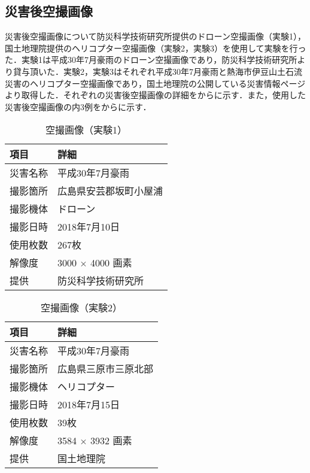     \subsection*{災害後空撮画像}
      災害後空撮画像について防災科学技術研究所提供のドローン空撮画像\cite{防災科研空撮画像}（実験1），国土地理院提供のヘリコプター空撮画像\cite{国土地理院空撮画像1, 国土地理院空撮画像2}（実験2，実験3）を使用して実験を行った．実験1は平成30年7月豪雨のドローン空撮画像であり，防災科学技術研究所より貸与頂いた．実験2，実験3はそれぞれ平成30年7月豪雨と熱海市伊豆山土石流災害のヘリコプター空撮画像であり，国土地理院の公開している災害情報ページより取得した．それぞれの災害後空撮画像の詳細をからに示す．また，使用した災害後空撮画像の内3例をからに示す．

      \begin{table}[t]
        \centering
        \caption{空撮画像（実験1）}
        \label{空撮画像（実験1）}
        \begin{tabular}{ll}
          \hline
          \textbf{項目} & \textbf{詳細} \\
          \hline \hline
          災害名称 & 平成30年7月豪雨 \\
          撮影箇所 & 広島県安芸郡坂町小屋浦 \\
          撮影機体 & ドローン \\
          撮影日時 & 2018年7月10日 \\
          使用枚数 & 267枚 \\
          解像度 & 3000 $\times$ 4000 画素 \\
          提供 & 防災科学技術研究所 \\ \hline
        \end{tabular}
      \end{table}

      \begin{table}[t]
        \centering
        \caption{空撮画像（実験2）}
        \begin{tabular}{ll}
          \hline
          \textbf{項目} & \textbf{詳細} \\
          \hline \hline
          災害名称 & 平成30年7月豪雨 \\
          撮影箇所 & 広島県三原市三原北部 \\
          撮影機体 & ヘリコプター \\
          撮影日時 & 2018年7月15日 \\
          使用枚数 & 39枚 \\
          解像度 & 3584 $\times$ 3932 画素 \\
          提供 & 国土地理院 \\ \hline
        \end{tabular}
      \end{table}


